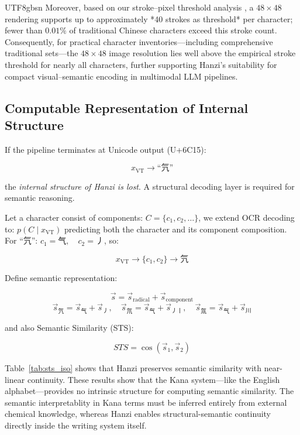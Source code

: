 \documentclass[conference]{IEEEtran}
\begin{document}
\begin{CJK*}{UTF8}{gbsn}
Moreover, based on our stroke–pixel threshold analysis \cite{weigang2025threshold}, a \(48\times48\) rendering supports up to approximately *40 strokes as threshold* per character; fewer than \(0.01\%\) of traditional Chinese characters exceed this stroke count. Consequently, for practical character inventories—including comprehensive traditional sets—the \(48\times48\) image resolution lies well above the empirical stroke threshold for nearly all characters, further supporting Hanzi’s suitability for compact visual–semantic encoding in multimodal LLM pipelines.

\subsection{Computable Representation of Internal Structure}
If the pipeline terminates at Unicode output (U+6C15):

\begin{equation}
x_{\text{VT}} \rightarrow \text{``氕''}
\end{equation}

the \emph{internal structure of Hanzi is lost}.  
A structural decoding layer is required for semantic reasoning.

Let a character consist of components: $C = \{c_1, c_2, \ldots\}$, we extend OCR decoding to:
$p(C \mid x_{\text{VT}})$
predicting both the character and its component composition. For ``氕'': $c_1 = \text{气}, \quad c_2 = \text{丿}$, so:

\begin{equation}
x_{\text{VT}} \rightarrow \{c_1, c_2\} \rightarrow \text{氕}
\end{equation}

Define semantic representation:

\begin{equation}
\vec{s} = \vec{s}_{\text{radical}} + \vec{s}_{\text{component}}
\end{equation}
\[ \vec{s}_{\text{氕}} = \vec{s}_{\text{气}} + \vec{s}_{\text{丿}}, \quad \vec{s}_{\text{氘}} = \vec{s}_{\text{气}} + \vec{s}_{\text{丿丨}}, \quad \vec{s}_{\text{氚}} = \vec{s}_{\text{气}} + \vec{s}_{\text{川}} \]

and also Semantic Similarity (STS):

\begin{equation}
STS = \cos(\vec{s}_1, \vec{s}_2)
\end{equation}

Table~\ref{tab:sts_iso} shows that Hanzi preserves semantic similarity with near-linear continuity. These results show that the Kana system—like the English alphabet—provides no intrinsic structure for computing semantic similarity. The semantic interpretablity in Kana terms must be inferred entirely from external chemical knowledge, whereas Hanzi enables structural-semantic continuity directly inside the writing system itself.


\end{CJK*}
\end{document}
